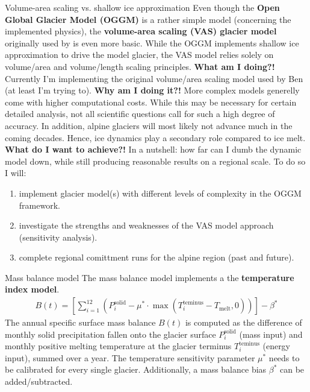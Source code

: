 \documentclass[final]{beamer}
\begin{document}
\begin{frame}[fragile]
\begin{columns}[t]
\begin{leftcolumn}
   \begin{boxblock}{Volume-area scaling vs. shallow ice approximation}
      Even though the \textbf{Open Global Glacier Model (OGGM)} is a rather simple model (concerning the implemented physics), the \textbf{volume-area scaling (VAS) glacier model} originally used by \citet{Marzeion2012} is even more basic. While the OGGM implements shallow ice approximation to drive the model glacier, the VAS model relies solely on volume/area and volume/length scaling principles.
      \vspace{0.3cm}
      \textbf{What am I doing?!} Currently I'm implementing the original volume/area scaling model used by Ben (at least I'm trying to).
      \vspace{0.3cm}
      \textbf{Why am I doing it?!} More complex models generelly come with higher computational costs. While this may be necessary for certain detailed analysis, not all scientific questions call for such a high degree of accuracy. In addition, alpine glaciers will most likely not advance much in the coming decades. Hence, ice dynamics play a secondary role compared to ice melt.
      \vspace{0.3cm}
      \textbf{What do I want to achieve?!} In a nutshell: how far can I dumb the dynamic model down, while still producing reasonable results on a regional  scale. To do so I will:
      \begin{enumerate}
         \item implement glacier model(s) with different levels of complexity in the OGGM framework.
         \item investigate the strengths and weaknesses of the VAS model approach (sensitivity analysis).
         \item complete regional comittment runs for the alpine region (past and future).
      \end{enumerate}
   \end{boxblock}

   \begin{boxblock}{Mass balance model}
      The mass balance model implements a the \textbf{temperature index model}.
      \begin{align}
         B(t) = \left[\sum_{i=1}^{12}(P_i^\text{solid} - \mu^* \cdot \max(T_i^\text{teminus} - T_\text{melt}, 0))\right] - \beta^*
      \end{align}
      The annual specific surface mass balance $B(t)$ is computed as the difference of monthly solid precipitation fallen onto the glacier surface $P_i^\text{solid}$ (mass input) and monthly positive melting temperature at the glacier terminus $T_i^\text{teminus}$ (energy input), summed over a year. The temperature sensitivity parameter $\mu^*$ needs to be calibrated for every single glacier. Additionally, a mass balance bias $\beta^*$ can be added/subtracted.
      


\end{boxblock}
\end{leftcolumn}
\end{columns}
\end{frame}
\end{document}
